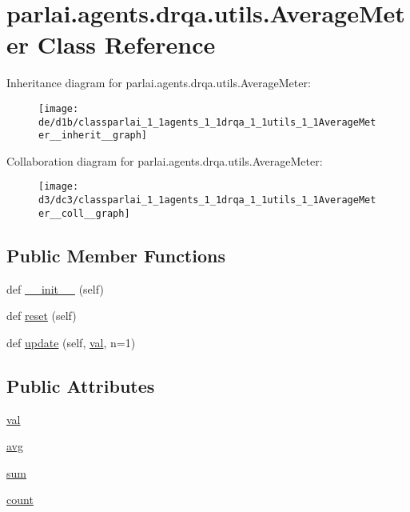 \hypertarget{classparlai_1_1agents_1_1drqa_1_1utils_1_1AverageMeter}{}\section{parlai.\+agents.\+drqa.\+utils.\+Average\+Meter Class Reference}
\label{classparlai_1_1agents_1_1drqa_1_1utils_1_1AverageMeter}


Inheritance diagram for parlai.\+agents.\+drqa.\+utils.\+Average\+Meter\+:\nopagebreak
\begin{figure}[H]
\begin{center}
\leavevmode
\texttt{[image: de/d1b/classparlai\_1\_1agents\_1\_1drqa\_1\_1utils\_1\_1AverageMeter\_\_inherit\_\_graph]}
\end{center}
\end{figure}


Collaboration diagram for parlai.\+agents.\+drqa.\+utils.\+Average\+Meter\+:\nopagebreak
\begin{figure}[H]
\begin{center}
\leavevmode
\texttt{[image: d3/dc3/classparlai\_1\_1agents\_1\_1drqa\_1\_1utils\_1\_1AverageMeter\_\_coll\_\_graph]}
\end{center}
\end{figure}
\subsection*{Public Member Functions}
\begin{DoxyCompactItemize}
\item 
def \hyperlink{classparlai_1_1agents_1_1drqa_1_1utils_1_1AverageMeter_a5d31ec2b9b8020da43ab0ca600cbe561}{\+\_\+\+\_\+init\+\_\+\+\_\+} (self)
\item 
def \hyperlink{classparlai_1_1agents_1_1drqa_1_1utils_1_1AverageMeter_adf03b2f21b820b30c0bf68334bda0b6e}{reset} (self)
\item 
def \hyperlink{classparlai_1_1agents_1_1drqa_1_1utils_1_1AverageMeter_a5a66f2a884034fcdf004468a980d1318}{update} (self, \hyperlink{classparlai_1_1agents_1_1drqa_1_1utils_1_1AverageMeter_a0b98a68fd8e5d78852462e6ab3822760}{val}, n=1)
\end{DoxyCompactItemize}
\subsection*{Public Attributes}
\begin{DoxyCompactItemize}
\item 
\hyperlink{classparlai_1_1agents_1_1drqa_1_1utils_1_1AverageMeter_a0b98a68fd8e5d78852462e6ab3822760}{val}
\item 
\hyperlink{classparlai_1_1agents_1_1drqa_1_1utils_1_1AverageMeter_aee254ce04bba670cb5839d0d8b602906}{avg}
\item 
\hyperlink{classparlai_1_1agents_1_1drqa_1_1utils_1_1AverageMeter_ab4cfd9c6c69772ef8828a14e3217508a}{sum}
\item 
\hyperlink{classparlai_1_1agents_1_1drqa_1_1utils_1_1AverageMeter_a4b3a149e43ba378d8cc4af3885e0c68f}{count}
\end{DoxyCompactItemize}


